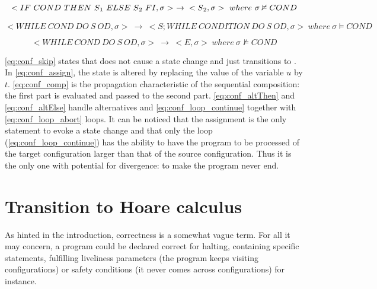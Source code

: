 \begin{equation}\label{eq:conf_altElse}
	<IF\ COND\ THEN\ S\textsubscript{1}\ ELSE\ S\textsubscript{2}\ FI,\sigma{}>\ \rightarrow{} <S\textsubscript{2},\sigma{}>\ where\ \sigma{} \nvDash{} COND
\end{equation}

\begin{equation}\label{eq:conf_loop_continue}
	<WHILE\ COND\ DO\ S\ OD,\sigma{}>\ \rightarrow{}\ <S;WHILE\ CONDITION\ DO\ S\ OD,\sigma{}>\ where\ \sigma{} \vDash{} COND
\end{equation}

\begin{equation}\label{eq:conf_loop_abort}
	<WHILE\ COND\ DO\ S\ OD,\sigma{}>\ \rightarrow{}\ <E,\sigma{}>\ where\ \sigma{} \nvDash{} COND
\end{equation}

\eqref{eq:conf_skip} states that  does not cause a state change and just transitions to . In \eqref{eq:conf_assign}, the state is altered by replacing the value of the variable $u$ by $t$. \eqref{eq:conf_comp} is the propagation characteristic of the sequential composition: the first part is evaluated and passed to the second part. \eqref{eq:conf_altThen} and \eqref{eq:conf_altElse} handle alternatives and \eqref{eq:conf_loop_continue} together with \eqref{eq:conf_loop_abort} loops. It can be noticed that the assignment is the only statement to evoke a state change and that only the loop (\eqref{eq:conf_loop_continue}) has the ability to have the  program to be processed of the target configuration larger than that of the source configuration. Thus it is the only one with potential for divergence: to make the program never end.



\section{Transition to Hoare calculus}

As hinted in the introduction, correctness is a somewhat vague term. For all it may concern, a program could be declared correct for halting, containing specific statements, fulfilling liveliness parameters (the program keeps visiting  configurations) or safety conditions (it never comes across  configurations) for instance.

